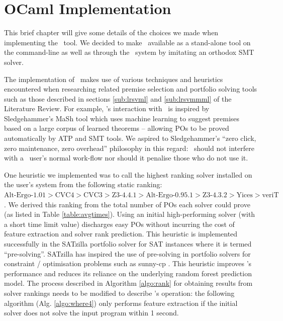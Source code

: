 \chapter{OCaml Implementation}
\thispagestyle{nohead}
\label{Implementation}

This brief chapter will give some details of the choices we made when implementing the \where~tool.
We decided to make \where~available as a stand-alone tool on the command-line as well as through the \why~system by imitating an orthodox SMT solver.   

The implementation of \where~makes use of various techniques and heuristics encountered when researching related premise selection and portfolio solving tools such as those described in sections \ref{sub:lrsvml} and \ref{sub:lrsvmmml} of the Literature Review.   
For example, \where's interaction with \why~is inspired by Sledgehammer's MaSh \cite{Sledgehammer} tool which uses machine learning to suggest premises based on a large corpus of learned theorems -- allowing POs to be proved automatically by ATP and SMT tools. 
We aspired to Sledgehammer's ``zero click, zero maintenance, zero overhead'' philosophy in this regard: \where~should not interfere with a \why~user's normal work-flow nor should it penalise those who do not use it.

One heuristic we implemented was to call the highest ranking solver installed on the user's system from the following static ranking:
$ \text{Alt-Ergo-1.01} > \text{CVC4} > \text{CVC3} > \text{Z3-4.4.1} > \text{Alt-Ergo-0.95.1} > \text{Z3-4.3.2} > \text{Yices} > \text{veriT} $.
We derived this ranking from the total number of POs each solver could prove (as listed in Table \ref{table:avgtimes}).
Using an initial high-performing solver (with a short time limit value) discharges easy POs without incurring the cost of feature extraction and solver rank prediction.
This heuristic is implemented successfully in the SATzilla  \cite{SATzilla2012} portfolio solver for SAT instances where it is termed ``pre-solving''.
SATzilla has inspired the use of pre-solving in portfolio solvers for constraint / optimisation problems such as sunny-cp \cite{sunny-cp}.
This heuristic improves \where's performance and reduces its reliance on the underlying random forest prediction model. 
The process described in Algorithm \ref{algo:rank} for obtaining results from solver rankings needs to be modified to describe \where's operation:
the following algorithm (Alg. \ref{algo:where4}) only performs feature extraction if the initial solver does not solve the input program within 1 second. 

